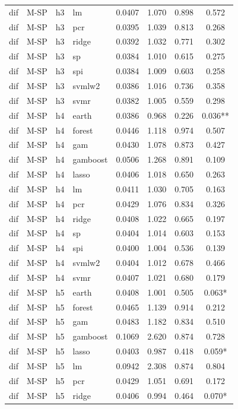 \begin{ThreePartTable}
\begin{longtable}[t]{llclcccc}
dif & M-SP & h3 & lm & 0.0407 & 1.070 & 0.898 & 0.572\\
dif & M-SP & h3 & pcr & 0.0395 & 1.039 & 0.813 & 0.268\\
dif & M-SP & h3 & ridge & 0.0392 & 1.032 & 0.771 & 0.302\\
dif & M-SP & h3 & sp & 0.0384 & 1.010 & 0.615 & 0.275\\
dif & M-SP & h3 & spi & 0.0384 & 1.009 & 0.603 & 0.258\\
dif & M-SP & h3 & svmlw2 & 0.0386 & 1.016 & 0.736 & 0.358\\
dif & M-SP & h3 & svmr & 0.0382 & 1.005 & 0.559 & 0.298\\
\addlinespace
dif & M-SP & h4 & earth & 0.0386 & 0.968 & 0.226 & 0.036**\\
dif & M-SP & h4 & forest & 0.0446 & 1.118 & 0.974 & 0.507\\
dif & M-SP & h4 & gam & 0.0430 & 1.078 & 0.873 & 0.427\\
dif & M-SP & h4 & gamboost & 0.0506 & 1.268 & 0.891 & 0.109\\
dif & M-SP & h4 & lasso & 0.0406 & 1.018 & 0.650 & 0.263\\
dif & M-SP & h4 & lm & 0.0411 & 1.030 & 0.705 & 0.163\\
dif & M-SP & h4 & pcr & 0.0429 & 1.076 & 0.834 & 0.326\\
dif & M-SP & h4 & ridge & 0.0408 & 1.022 & 0.665 & 0.197\\
dif & M-SP & h4 & sp & 0.0404 & 1.014 & 0.603 & 0.153\\
dif & M-SP & h4 & spi & 0.0400 & 1.004 & 0.536 & 0.139\\
dif & M-SP & h4 & svmlw2 & 0.0404 & 1.012 & 0.678 & 0.466\\
dif & M-SP & h4 & svmr & 0.0407 & 1.021 & 0.680 & 0.179\\
\addlinespace
dif & M-SP & h5 & earth & 0.0408 & 1.001 & 0.505 & 0.063*\\
dif & M-SP & h5 & forest & 0.0465 & 1.139 & 0.914 & 0.212\\
dif & M-SP & h5 & gam & 0.0483 & 1.182 & 0.834 & 0.510\\
dif & M-SP & h5 & gamboost & 0.1069 & 2.620 & 0.874 & 0.728\\
dif & M-SP & h5 & lasso & 0.0403 & 0.987 & 0.418 & 0.059*\\
dif & M-SP & h5 & lm & 0.0942 & 2.308 & 0.874 & 0.804\\
dif & M-SP & h5 & pcr & 0.0429 & 1.051 & 0.691 & 0.172\\
dif & M-SP & h5 & ridge & 0.0406 & 0.994 & 0.464 & 0.070*\\

\end{longtable}
\end{ThreePartTable}
